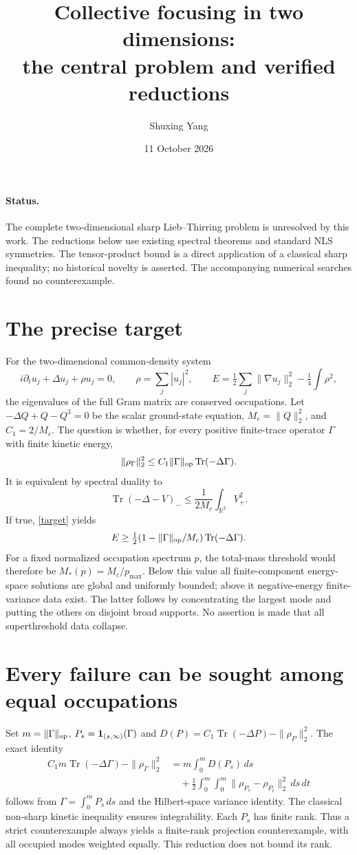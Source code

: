\documentclass[11pt]{article}
\title{Collective focusing in two dimensions:\\the central problem and verified reductions}
\author{Shuxing Yang}
\date{11 October 2026}
\newcommand{\Tr}{\operatorname{Tr}}
\begin{document}
\maketitle
\paragraph{Status.}
The complete two-dimensional sharp Lieb--Thirring problem is unresolved
by this work. The reductions below use existing spectral theorems and
standard NLS symmetries. The tensor-product bound is a direct application
of a classical sharp inequality; no historical novelty is asserted.
The accompanying numerical searches found no counterexample.

\section{The precise target}
For the two-dimensional common-density system
\[
 i\partial_tu_j+\Delta u_j+\rho u_j=0,\qquad
 \rho=\sum_j|u_j|^2,\qquad
 E=\tfrac12\sum_j\|\nabla u_j\|_2^2-\tfrac14\int\rho^2,
\]
the eigenvalues of the full Gram matrix are conserved occupations.
Let $-\Delta Q+Q-Q^3=0$ be the scalar ground-state equation,
$M_c=\|Q\|_2^2$, and $C_1=2/M_c$.
The question is whether, for every positive finite-trace operator
$\Gamma$ with finite kinetic energy,
\begin{equation}\label{target}
 \|\rho_\Gamma\|_2^2\le C_1\|\Gamma\|_{\rm op}\Tr(-\Delta\Gamma).
\end{equation}
It is equivalent by spectral duality to
\[
 \Tr(-\Delta-V)_-\le \frac{1}{2M_c}\int_{\mathbb R^2}V_+^2.
\]
If true, \eqref{target} yields
\[
 E\ge\tfrac12(1-\|\Gamma\|_{\rm op}/M_c)\Tr(-\Delta\Gamma).
\]
For a fixed normalized occupation spectrum $p$, the total-mass threshold
would therefore be $M_*(p)=M_c/p_{\max}$. Below this value all
finite-component energy-space solutions are global and uniformly bounded;
above it negative-energy finite-variance data exist. The latter follows
by concentrating the largest mode and putting the others on disjoint
broad supports. No assertion is made that all superthreshold data collapse.

\section{Every failure can be sought among equal occupations}
Set $m=\|\Gamma\|_{\rm op}$, $P_s={\bf1}_{(s,\infty)}(\Gamma)$ and
$D(P)=C_1\Tr(-\Delta P)-\|\rho_P\|_2^2$. The exact identity
\begin{align*}
 C_1m\Tr(-\Delta\Gamma)-\|\rho_\Gamma\|_2^2
 &=m\int_0^mD(P_s)\,ds\\
 &\quad+\tfrac12\int_0^m\int_0^m
       \|\rho_{P_s}-\rho_{P_t}\|_2^2\,ds\,dt
\end{align*}
follows from $\Gamma=\int_0^mP_s\,ds$ and the Hilbert-space variance
identity. The classical non-sharp kinetic inequality ensures integrability.
Each $P_s$ has finite rank. Thus a strict counterexample always yields
a finite-rank projection counterexample, with all occupied modes weighted
equally. This reduction does not bound its rank.
\end{document}
